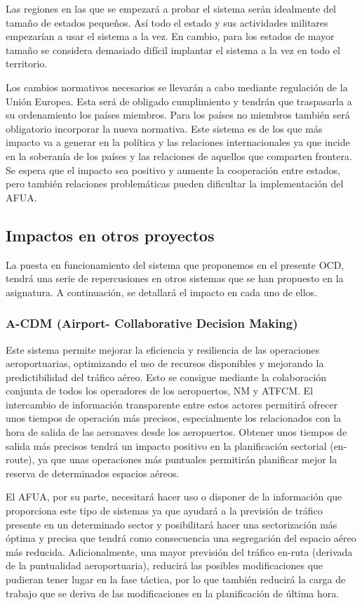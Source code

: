 Las regiones en las que se empezará a probar el sistema serán idealmente del tamaño de estados pequeños. Así todo el estado y sus actividades militares empezarían a usar el sistema a la vez. En cambio, para los estados de mayor tamaño se considera demasiado difícil implantar el sistema a la vez en todo el territorio.

Los cambios normativos necesarios se llevarán a cabo mediante regulación de la Unión Europea. Esta será de obligado cumplimiento y tendrán que traspasarla a su ordenamiento los países miembros. Para los países no miembros también será obligatorio incorporar la nueva normativa. Este sistema es de los que más impacto va a generar en la política y las relaciones internacionales ya que incide en la soberanía de los países y las relaciones de aquellos que comparten frontera. Se espera que el impacto sea positivo y aumente la cooperación entre estados, pero también relaciones problemáticas pueden dificultar la implementación del AFUA.

\subsection{Impactos en otros proyectos}

La puesta en funcionamiento del sistema que proponemos en el presente OCD, tendrá una serie de repercusiones en otros sistemas que se han propuesto en la asignatura. A continuación, se detallará el impacto en cada uno de ellos.

\subsubsection{A-CDM (Airport- Collaborative Decision Making)}

Este sistema permite mejorar la eficiencia y resiliencia de las operaciones aeroportuarias, optimizando el uso de recursos disponibles y mejorando la predictibilidad del tráfico aéreo. Esto se consigue mediante la colaboración conjunta de todos los operadores de los aeropuertos, NM y ATFCM. El intercambio de información transparente entre estos actores permitirá ofrecer unos tiempos de operación más precisos, especialmente los relacionados con la hora de salida de las aeronaves desde los aeropuertos. Obtener unos tiempos de salida más precisos tendrá un impacto positivo en la planificación sectorial (en-route), ya que unas operaciones más puntuales permitirán planificar mejor la reserva de determinados espacios aéreos. 

El AFUA, por su parte, necesitará hacer uso o disponer de la información que proporciona este tipo de sistemas ya que ayudará a la previsión de tráfico presente en un determinado sector y posibilitará hacer una sectorización más óptima y precisa que tendrá como consecuencia una segregación del espacio aéreo más reducida. Adicionalmente, una mayor previsión del tráfico en-ruta (derivada de la puntualidad aeroportuaria), reducirá las posibles modificaciones que pudieran tener lugar en la fase táctica, por lo que también reducirá la carga de trabajo que se deriva de las modificaciones en la planificación de última hora.

